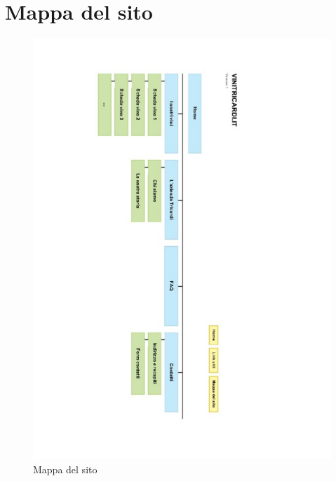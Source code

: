 \documentclass[a4paper]{report}	%
\begin{document}
\chapter{Mappa del sito}
\begin{figure}
\centering
\includegraphics[scale=0.6]{mappa_del_sito_ver1.pdf}
\caption{Mappa del sito}\label{fig1}
\end{figure}
\end{document}
